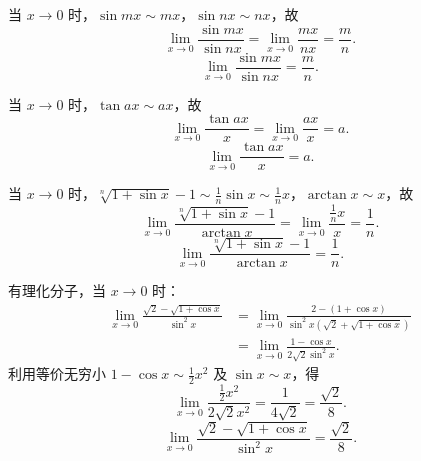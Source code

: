 \begin{solution}

    当 $x \to 0$ 时，$\sin mx \sim mx$，$\sin nx \sim nx$，故
    \begin{equation}
        \lim_{x\to 0} \frac{\sin mx}{\sin nx} = \lim_{x\to 0} \frac{mx}{nx} = \frac{m}{n}.
    \end{equation}
    \begin{equation}
        \boxed{\lim_{x\to 0} \frac{\sin mx}{\sin nx} = \frac{m}{n}.}
    \end{equation}


    当 $x \to 0$ 时，$\tan ax \sim ax$，故
    \begin{equation}
        \lim_{x\to 0} \frac{\tan ax}{x} = \lim_{x\to 0} \frac{ax}{x} = a.
    \end{equation}
    \begin{equation}
        \boxed{\lim_{x\to 0} \frac{\tan ax}{x} = a.}
    \end{equation}


    当 $x \to 0$ 时，$\sqrt[n]{1+\sin x}-1 \sim \frac{1}{n} \sin x \sim \frac{1}{n} x$，$\arctan x \sim x$，故
    \begin{equation}
        \lim_{x\to 0} \frac{\sqrt[n]{1+\sin x}-1}{\arctan x} = \lim_{x\to 0} \frac{\frac{1}{n}x}{x} = \frac{1}{n}.
    \end{equation}
    \begin{equation}
        \boxed{\lim_{x\to 0} \frac{\sqrt[n]{1+\sin x}-1}{\arctan x} = \frac{1}{n}.}
    \end{equation}


    有理化分子，当 $x \to 0$ 时：
    \begin{equation}
        \begin{aligned}
            \lim_{x\to 0} \frac{\sqrt{2}-\sqrt{1+\cos x}}{\sin^2 x} & = \lim_{x\to 0} \frac{2 - (1 + \cos x)}{\sin^2 x (\sqrt{2} + \sqrt{1+\cos x})} \\
                                                                    & = \lim_{x\to 0} \frac{1 - \cos x}{2\sqrt{2}\sin^2 x}.
        \end{aligned}
    \end{equation}
    利用等价无穷小 $1 - \cos x \sim \frac{1}{2} x^2$ 及 $\sin x \sim x$，得
    \begin{equation}
        \lim_{x\to 0} \frac{\frac{1}{2}x^2}{2\sqrt{2} x^2} = \frac{1}{4\sqrt{2}} = \frac{\sqrt{2}}{8}.
    \end{equation}
    \begin{equation}
        \boxed{\lim_{x\to 0} \frac{\sqrt{2}-\sqrt{1+\cos x}}{\sin^2 x} = \frac{\sqrt{2}}{8}.}
    \end{equation}


\end{solution}
